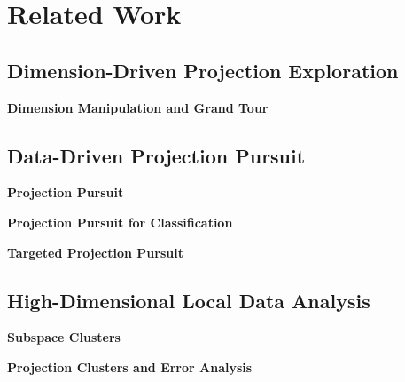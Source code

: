\section{Related Work}

\subsection{Dimension-Driven Projection Exploration}
\textbf{Dimension Manipulation and Grand Tour}
~\cite{DBLP:journals/tvcg/NamM13}~\cite{DBLP:journals/tvcg/LehmannT13}~\cite{DBLP:journals/cgf/JeongZFRC09}

\subsection{Data-Driven Projection Pursuit}
\textbf{Projection Pursuit}
~\cite{DBLP:journals/tc/FriedmanT74}~\cite{cook1995grand}~\cite{DBLP:journals/ivs/SeoS05}~\cite{DBLP:journals/tvcg/JohanssonJ09}

\textbf{Projection Pursuit for Classification}
~\cite{DBLP:journals/cgf/SipsNLH09}~\cite{DBLP:conf/ieeevast/ChooLKP10}

\textbf{Targeted Projection Pursuit}
~\cite{DBLP:journals/tvcg/JoiaCCPN11}~\cite{DBLP:conf/ieeevast/BrownLBC12}~\cite{DBLP:journals/tvcg/Gleicher13}~\cite{DBLP:journals/tvcg/HuBMHNL13}

\subsection{High-Dimensional Local Data Analysis}
\textbf{Subspace Clusters}
~\cite{DBLP:journals/tvcg/YuanRWG13}~\cite{DBLP:journals/cgf/LiuWTBP15}

\textbf{Projection Clusters and Error Analysis}
~\cite{DBLP:conf/ieeevast/Kandogan12}~\cite{DBLP:journals/cg/MartinsCMT14}~\cite{DBLP:journals/tvcg/StahnkeDMT16}